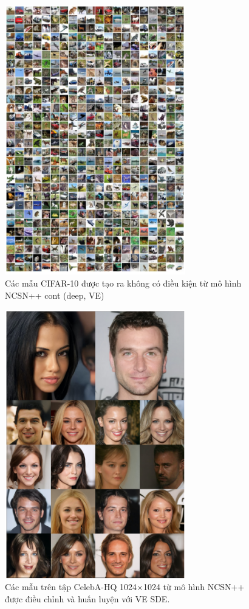\documentclass{article} %
\begin{document}
\begin{figure}[h!]
    \centering
    \includegraphics[width=0.7\textwidth]{figures/11.png}
    \caption{Các mẫu CIFAR-10 được tạo ra không có điều kiện từ mô hình NCSN++ cont (deep, VE)}
    \label{fig:11}
\end{figure}

\begin{figure}[h!]
    \centering
    \includegraphics[width=0.7\textwidth]{figures/12.png}
    \caption{Các mẫu trên tập CelebA-HQ 1024$\times$1024 từ mô hình NCSN++ được điều chỉnh và huấn luyện với VE SDE.}
    \label{fig:12}
\end{figure}
\end{document}

